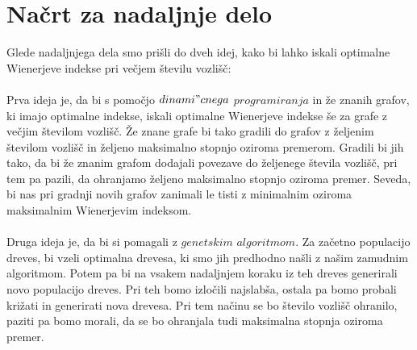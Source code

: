\documentclass[a4paper]{article}
\begin{document}
\section{Načrt za nadaljnje delo}

Glede nadaljnjega dela smo prišli do dveh idej, kako bi lahko iskali optimalne Wienerjeve indekse pri večjem številu vozlišč:
\\
\\
Prva ideja je, da bi s pomočjo $dinami"cnega$ $programiranja$ in že znanih grafov, ki imajo optimalne indekse,
iskali optimalne Wienerjeve indekse še za grafe z večjim številom vozlišč. Že znane grafe bi tako gradili do grafov 
z željenim številom vozlišč in željeno maksimalno stopnjo oziroma premerom. Gradili bi jih tako, da bi že znanim 
grafom dodajali povezave do željenege števila vozlišč, pri tem pa pazili, da ohranjamo željeno maksimalno stopnjo 
oziroma premer. Seveda, bi nas pri gradnji novih grafov zanimali le tisti z minimalnim oziroma maksimalnim Wienerjevim indeksom.
\\
\\
Druga ideja je, da bi si pomagali z $genetskim$ $algoritmom$.  Za začetno populacijo dreves, bi vzeli optimalna drevesa,
ki smo jih predhodno našli z našim zamudnim algoritmom. Potem pa bi na vsakem nadaljnjem koraku iz teh dreves 
generirali novo populacijo dreves. Pri teh bomo izločili najslabša, ostala pa bomo probali križati in generirati nova drevesa.
Pri tem načinu se bo število vozlišč ohranilo, paziti pa bomo morali, da se bo ohranjala tudi maksimalna stopnja oziroma premer.
\end{document}
